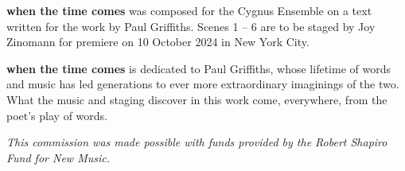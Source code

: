\textbf{when the time comes} was composed for the Cygnus Ensemble on a text
written for the work by Paul Griffiths. Scenes 1 -- 6 are to be staged by Joy
Zinomann for premiere on 10 October 2024 in New York City.

\textbf{when the time comes} is dedicated to Paul Griffiths, whose lifetime of
words and music has led generations to ever more extraordinary imaginings of
the two. What the music and staging discover in this work come, everywhere,
from the poet's play of words.

\begin{center}
\textit{This commission was made possible with funds provided by the Robert
Shapiro Fund for New Music.}
\end{center}
